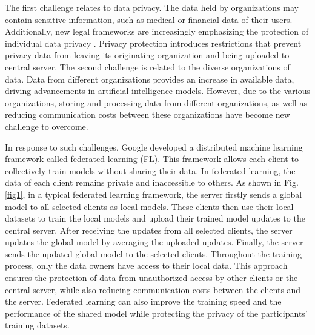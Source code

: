 \documentclass[conference]{IEEEtran}
\begin{document}
The first challenge relates to data privacy. 
The data held by organizations may contain sensitive information, 
such as medical or financial data of their users. 
Additionally, new legal frameworks are increasingly 
emphasizing the protection of individual data privacy \cite{b2}. 
Privacy protection introduces restrictions that prevent 
privacy data from leaving its originating organization 
and being uploaded to central server.
The second challenge is related to the diverse organizations of data. 
Data from different organizations provides an increase in available data, 
driving advancements in artificial intelligence models. 
However, due to the various organizations, 
storing and processing data from different organizations, 
as well as reducing communication costs between these organizations 
have become new challenge to overcome.

In response to such challenges, Google \cite{b3} developed a distributed 
machine learning framework called federated learning (FL). 
This framework allows each client 
to collectively train models without sharing their data.
In federated learning, the data of each client remains private and inaccessible 
to others. 
As shown in Fig.\ref{fig1}, in a typical federated learning framework, 
the server firstly sends a global model to all selected clients as local models. 
These clients then use their local datasets to train the 
local models and upload their trained model updates to the central server.
After receiving the updates from all selected clients, 
the server updates the global model by averaging the uploaded updates.
Finally, the server sends the updated global model to the selected clients. 
Throughout the training process, only the data owners 
have access to their local data. 
This approach ensures the protection of data 
from unauthorized access by other clients or the central server, 
while also reducing communication costs between the clients and the server. 
Federated learning can also improve the training speed and the performance of the
shared model while protecting the privacy of the participants' training datasets\cite{b4}.
\end{document}

